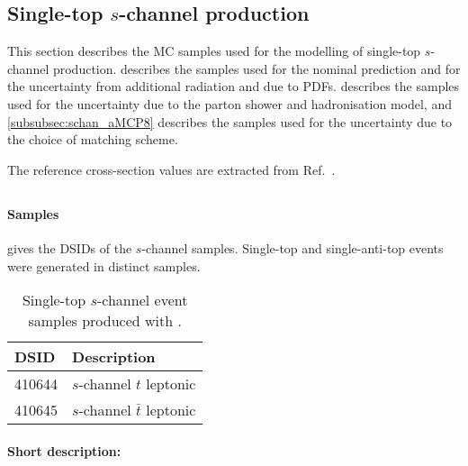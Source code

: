 \subsection{Single-top \texorpdfstring{\(s\)}{s}-channel production}
\label{subsec:schan}

This section describes the MC samples used for the modelling of single-top \(s\)-channel production.
 describes the \POWPY[8] samples used for the nominal prediction
and for the uncertainty from additional radiation and due to PDFs.
 describes the \POWHER[7] samples used for the uncertainty due to the parton shower and hadronisation model,
and \cref{subsubsec:schan_aMCP8} describes the \MGNLOPY[8] samples used for the uncertainty due to the choice of matching scheme.

The reference cross-section values are extracted from Ref.~\cite{LHCTopWGsgtopXsec}.

\subsection[Powheg+Pythia8]{\POWPY[8]}
\label{subsubsec:schan_PP8}

\paragraph{Samples}

 gives the DSIDs of the \(s\)-channel \POWPY[8] samples.
Single-top and single-anti-top events were generated in distinct samples.

\begin{table}[htbp]
  \caption{Single-top \(s\)-channel event samples produced with \POWPY[8].}%
  \label{tab:schan_PP8}
  \centering
  \begin{tabular}{l l}
    \toprule
    DSID & Description \\
    \midrule
    410644 & \(s\)-channel \(t\) leptonic \\
    410645 & \(s\)-channel \(\bar{t}\) leptonic \\
    \bottomrule
  \end{tabular}
\end{table}

\paragraph{Short description:}

